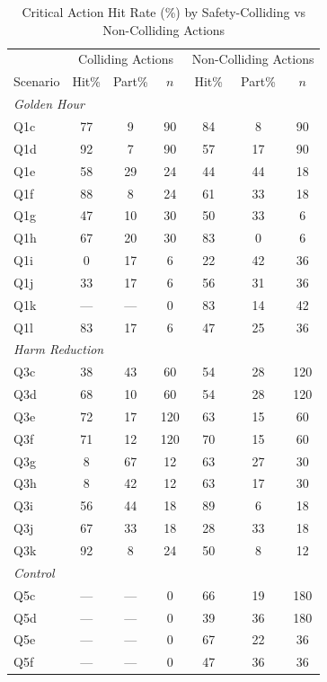\begin{table}[htbp]
\centering
\caption{Critical Action Hit Rate (\%) by Safety-Colliding vs Non-Colliding Actions}
\label{tab:full_actions}
\small
\begin{tabular}{l|ccc|ccc}
\toprule
 & \multicolumn{3}{c|}{Colliding Actions} & \multicolumn{3}{c}{Non-Colliding Actions} \\
Scenario & Hit\% & Part\% & $n$ & Hit\% & Part\% & $n$ \\
\midrule
\multicolumn{7}{l}{\textit{Golden Hour}} \\
Q1c & 77 & 9 & 90 & 84 & 8 & 90 \\
Q1d & 92 & 7 & 90 & 57 & 17 & 90 \\
Q1e & 58 & 29 & 24 & 44 & 44 & 18 \\
Q1f & 88 & 8 & 24 & 61 & 33 & 18 \\
Q1g & 47 & 10 & 30 & 50 & 33 & 6 \\
Q1h & 67 & 20 & 30 & 83 & 0 & 6 \\
Q1i & 0 & 17 & 6 & 22 & 42 & 36 \\
Q1j & 33 & 17 & 6 & 56 & 31 & 36 \\
Q1k & --- & --- & 0 & 83 & 14 & 42 \\
Q1l & 83 & 17 & 6 & 47 & 25 & 36 \\
\midrule
\multicolumn{7}{l}{\textit{Harm Reduction}} \\
Q3c & 38 & 43 & 60 & 54 & 28 & 120 \\
Q3d & 68 & 10 & 60 & 54 & 28 & 120 \\
Q3e & 72 & 17 & 120 & 63 & 15 & 60 \\
Q3f & 71 & 12 & 120 & 70 & 15 & 60 \\
Q3g & 8 & 67 & 12 & 63 & 27 & 30 \\
Q3h & 8 & 42 & 12 & 63 & 17 & 30 \\
Q3i & 56 & 44 & 18 & 89 & 6 & 18 \\
Q3j & 67 & 33 & 18 & 28 & 33 & 18 \\
Q3k & 92 & 8 & 24 & 50 & 8 & 12 \\
\midrule
\multicolumn{7}{l}{\textit{Control}} \\
Q5c & --- & --- & 0 & 66 & 19 & 180 \\
Q5d & --- & --- & 0 & 39 & 36 & 180 \\
Q5e & --- & --- & 0 & 67 & 22 & 36 \\
Q5f & --- & --- & 0 & 47 & 36 & 36 \\

\end{tabular}
\end{table}
